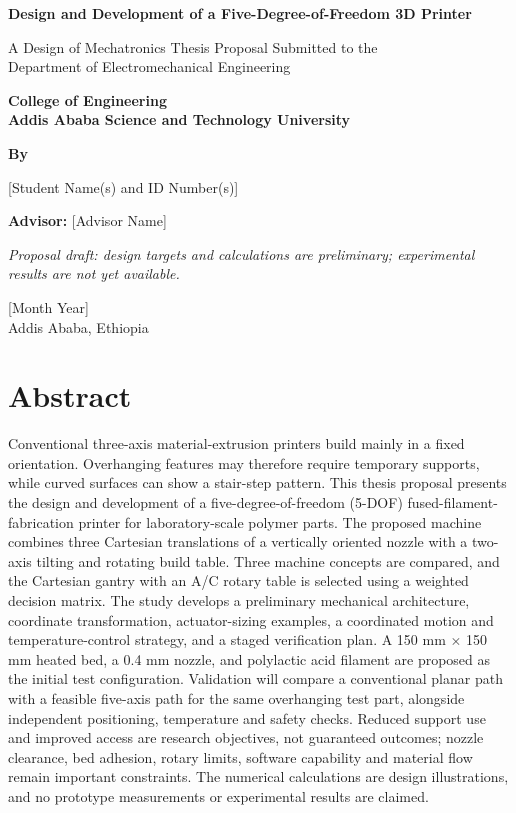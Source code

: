 \documentclass[12pt,a4paper]{article}
\newcommand{\thesistitle}{Design and Development of a Five-Degree-of-Freedom 3D Printer}
\newcommand{\thesisauthor}{[Student Name(s) and ID Number(s)]}
\newcommand{\thesisadvisor}{[Advisor Name]}
\newcommand{\thesisdate}{[Month Year]}
\newcommand{\thesisdepartment}{Department of Electromechanical Engineering}
\newcommand{\thesiscollege}{College of Engineering}
\newcommand{\thesisuniversity}{Addis Ababa Science and Technology University}
\begin{document}
\hypersetup{pageanchor=false}
\begin{titlepage}
  \centering
  \vspace*{1cm}
  {\Large\bfseries \thesistitle\par}
  \vspace{1.5cm}
  A Design of Mechatronics Thesis Proposal Submitted to the\\
  \thesisdepartment\par
  \vspace{1cm}
  {\bfseries \thesiscollege\\ \thesisuniversity\par}
  \vspace{1.5cm}
  {\bfseries By}\par
  \vspace{0.5cm}
  \thesisauthor\par
  \vspace{1.5cm}
  \textbf{Advisor:} \thesisadvisor\par
  \vspace{1cm}
  {\small\itshape Proposal draft: design targets and calculations are preliminary; experimental results
  are not yet available.\par}
  \vfill
  \thesisdate\\
  Addis Ababa, Ethiopia
\end{titlepage}
\hypersetup{pageanchor=true}

\section*{Abstract}\label{abstract}

Conventional three-axis material-extrusion printers build mainly in a fixed orientation. Overhanging
  features may therefore require temporary supports, while curved surfaces can show a stair-step pattern.
  This thesis proposal presents the design and development of a five-degree-of-freedom (5-DOF)
  fused-filament-fabrication printer for laboratory-scale polymer parts. The proposed machine combines
  three Cartesian translations of a vertically oriented nozzle with a two-axis tilting and rotating build
  table. Three machine concepts are compared, and the Cartesian gantry with an A/C rotary table is
  selected using a weighted decision matrix. The study develops a preliminary mechanical architecture,
  coordinate transformation, actuator-sizing examples, a coordinated motion and temperature-control
  strategy, and a staged verification plan. A 150 mm \ensuremath{\times} 150 mm heated bed, a 0.4 mm
  nozzle, and polylactic acid filament are proposed as the initial test configuration. Validation will
  compare a conventional planar path with a feasible five-axis path for the same overhanging test part,
  alongside independent positioning, temperature and safety checks. Reduced support use and improved
  access are research objectives, not guaranteed outcomes; nozzle clearance, bed adhesion, rotary limits,
  software capability and material flow remain important constraints. The numerical calculations are
  design illustrations, and no prototype measurements or experimental results are claimed.
\end{document}
